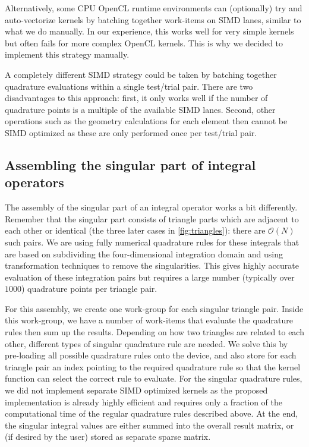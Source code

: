 \documentclass{IEEEcsmag}
\begin{document}
Alternatively, some CPU OpenCL runtime environments can (optionally) try and auto-vectorize kernels by batching together work-items on SIMD lanes, similar to what we do manually. In our experience, this works well for very simple kernels but often fails for more complex OpenCL kernels. This is why we decided to implement this strategy manually.

A completely different SIMD strategy could be taken by batching together quadrature evaluations within a single test/trial pair. There are two disadvantages to this approach: first, it only works well if the number of quadrature points is a multiple of the available SIMD lanes. Second, other operations such as the geometry calculations for each element then cannot be SIMD optimized as these are only performed once per test/trial pair.

\subsection{Assembling the singular part of integral operators}
The assembly of the singular part of an integral operator works a bit differently. Remember that the singular part consists of triangle parts which are adjacent to each other or identical (the three later cases in \cref{fig:triangles}): there are $\mathcal{O}(N)$ such pairs. We are using fully numerical quadrature rules for these integrals that are based on subdividing the four-dimensional integration domain and using transformation techniques to remove the singularities. This gives highly accurate evaluation of these integration pairs but requires a large number (typically over $1000$) quadrature points per triangle pair.

For this assembly, we create one work-group for each singular triangle pair. Inside this work-group, we have a number of work-items that evaluate the quadrature rules then sum up the results. Depending on how two triangles are related to each other, different types of singular quadrature rule are needed. We solve this by pre-loading all possible quadrature rules onto the device, and also store for each triangle pair an index pointing to the required quadrature rule so that the kernel function can select the correct rule to evaluate. For the singular quadrature rules, we did not implement separate SIMD optimized kernels as the proposed implementation is already highly efficient and requires only a fraction of the computational time of the regular quadrature rules described above. At the end, the singular integral values are either summed into the overall result matrix, or (if desired by the user) stored as separate sparse matrix.
\end{document}
